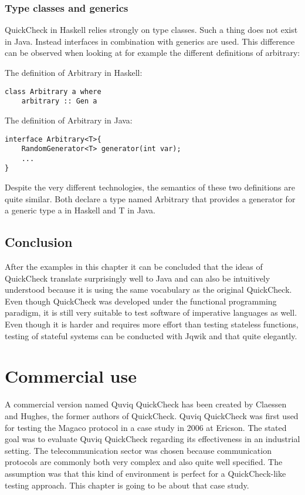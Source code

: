 \documentclass[a4paper, 12pt]{article} %
\begin{document}
\subsubsection{Type classes and generics}

QuickCheck in Haskell relies strongly on type classes. Such a thing does not exist in Java. Instead interfaces in combination with generics are used. This difference can be observed when looking at for example the different definitions of arbitrary:

The definition of Arbitrary in Haskell:

\begin{verbatim}
class Arbitrary a where
    arbitrary :: Gen a
\end{verbatim}

The definition of Arbitrary in Java:

\begin{verbatim}
interface Arbitrary<T>{
    RandomGenerator<T> generator(int var);
    ...
}
\end{verbatim}

Despite the very different technologies, the semantics of these two definitions are quite similar. Both declare a type named Arbitrary that provides a generator for a generic type a in Haskell and T in Java.

\subsection{Conclusion}

After the examples in this chapter it can be concluded that the ideas of QuickCheck translate surprisingly well to Java and can also be intuitively understood because it is using the same vocabulary as the original QuickCheck. Even though QuickCheck was developed under the functional programming paradigm, it is still very suitable to test software of imperative languages as well. Even though it is harder and requires more effort than testing stateless functions, testing of stateful systems can be conducted with Jqwik and that quite elegantly.

\newpage
\section{Commercial use}

A commercial version named Quviq QuickCheck has been created by Claessen and Hughes, the former authors of QuickCheck. Quviq QuickCheck was first used for testing the Magaco protocol in a case study in 2006 at Ericson. The stated goal was to evaluate Quviq QuickCheck regarding its effectiveness in an industrial setting. The telecommunication sector was chosen because communication protocols are commonly both very complex and also quite well specified. The assumption was that this kind of environment is perfect for a QuickCheck-like testing approach. This chapter is going to be about that case study. \cite{Arts06}
\end{document}
